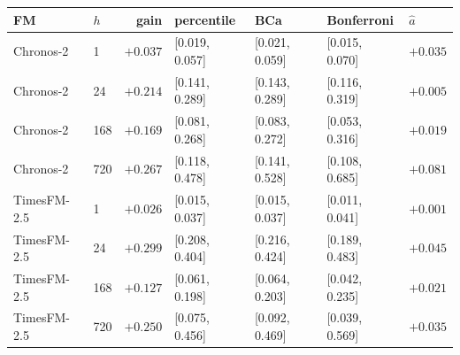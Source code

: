 \begin{tabular}{llrllll}
\toprule
FM & $h$ & gain & percentile & BCa & Bonferroni & $\widehat{a}$ \\
\midrule
Chronos-2 & 1 & $+0.037$ & [0.019, 0.057] & [0.021, 0.059] & [0.015, 0.070] & $+0.035$ \\
Chronos-2 & 24 & $+0.214$ & [0.141, 0.289] & [0.143, 0.289] & [0.116, 0.319] & $+0.005$ \\
Chronos-2 & 168 & $+0.169$ & [0.081, 0.268] & [0.083, 0.272] & [0.053, 0.316] & $+0.019$ \\
Chronos-2 & 720 & $+0.267$ & [0.118, 0.478] & [0.141, 0.528] & [0.108, 0.685] & $+0.081$ \\
TimesFM-2.5 & 1 & $+0.026$ & [0.015, 0.037] & [0.015, 0.037] & [0.011, 0.041] & $+0.001$ \\
TimesFM-2.5 & 24 & $+0.299$ & [0.208, 0.404] & [0.216, 0.424] & [0.189, 0.483] & $+0.045$ \\
TimesFM-2.5 & 168 & $+0.127$ & [0.061, 0.198] & [0.064, 0.203] & [0.042, 0.235] & $+0.021$ \\
TimesFM-2.5 & 720 & $+0.250$ & [0.075, 0.456] & [0.092, 0.469] & [0.039, 0.569] & $+0.035$ \\
\bottomrule
\end{tabular}
